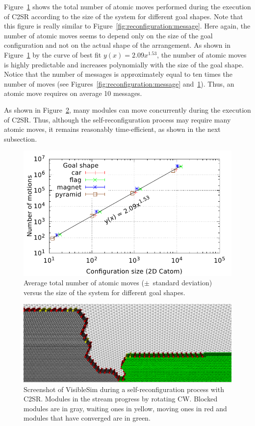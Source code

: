 Figure~\ref{fig:reconfiguration:cmotion} shows the total number of atomic moves performed during the execution of C2SR according to the size of the system for different goal shapes. Note that this figure is really similar to Figure~\ref{fig:reconfiguration:message}. Here again, the number of atomic moves seems to depend only on the size of the goal configuration and not on the actual shape of the arrangement. As shown in Figure~\ref{fig:reconfiguration:cmotion} by the curve of best fit $y(x) = 2.09x^{1.53}$, the number of atomic moves is highly predictable and increases polynomially with the size of the goal shape. Notice that the number of messages is approximately equal to ten times the number of moves (see Figures~\ref{fig:reconfiguration:message} and~\ref{fig:reconfiguration:cmotion}). Thus, an atomic move requires on average 10 messages.

As shown in Figure~\ref{fig:reconfiguration:parallelism}, many modules can move concurrently during the execution of C2SR. Thus, although the self-reconfiguration process may require many atomic moves, it remains reasonably time-efficient, as shown in the next subsection.

\begin{figure}[!h]
	\centering
	\includegraphics[width=0.7\linewidth]{images/reconfiguration/graphs/motion}
	\caption{Average total number of atomic moves ($\pm$~standard deviation) versus the size of the system for different goal shapes.}
	\label{fig:reconfiguration:cmotion}
\end{figure}

\begin{figure}[!h]
	\centering
	\includegraphics[width=0.7\linewidth]{images/reconfiguration/parallelism}
	\caption{Screenshot of VisibleSim during a self-reconfiguration process with C2SR. Modules in the stream progress by rotating CW. Blocked modules are in gray, waiting ones in yellow, moving ones in red and modules that have converged are in green.}
	\label{fig:reconfiguration:parallelism}
\end{figure}

